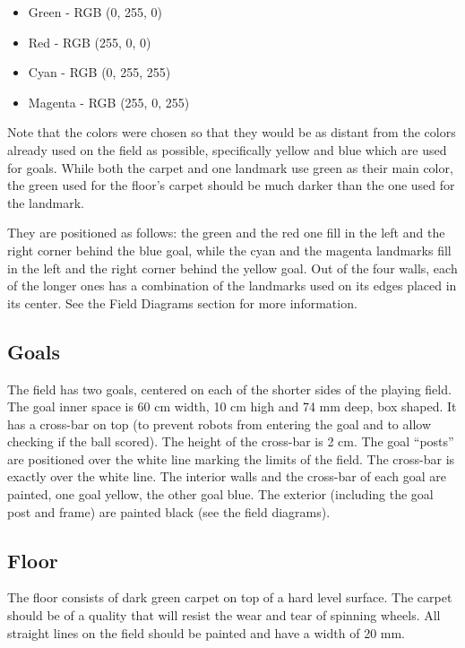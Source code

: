 \documentclass{article}
\begin{document}
\begin{itemize}
\item Green - RGB (0, 255, 0)

\item Red - RGB (255, 0, 0)

\item Cyan - RGB (0, 255, 255)

\item Magenta - RGB (255, 0, 255)

\end{itemize}

Note that the colors were chosen so that they would be as distant from the
colors already used on the field as possible, specifically yellow and blue
which are used for goals. While both the carpet and one landmark use green as
their main color, the green used for the floor's carpet should be much darker
than the one used for the landmark.

They are positioned as follows: the green and the red one fill in the left and
the right corner behind the blue goal, while the cyan and the magenta landmarks
fill in the left and the right corner behind the yellow goal. Out of the four
walls, each of the longer ones has a combination of the landmarks used on its
edges placed in its center. See the Field Diagrams section for more
information.

\subsection{ Goals \label{ref-032}}

The field has two goals, centered on each of the shorter sides of the playing
field. The goal inner space is 60 cm width, 10 cm high and 74 mm deep, box
shaped. It has a cross-bar on top (to prevent robots from entering the goal and
to allow checking if the ball scored). The height of the cross-bar is 2 cm. The
goal ``posts'' are positioned over the white line marking the limits of the
field. The cross-bar is exactly over the white line. The interior walls and the
cross-bar of each goal are painted, one goal yellow, the other goal blue. The
exterior (including the goal post and frame) are painted black (see the field
diagrams).

\subsection{ Floor \label{ref-033}}

The floor consists of dark green carpet on top of a hard level surface. The
carpet should be of a quality that will resist the wear and tear of spinning
wheels. All straight lines on the field should be painted and have a width of
20 mm.
\end{document}
